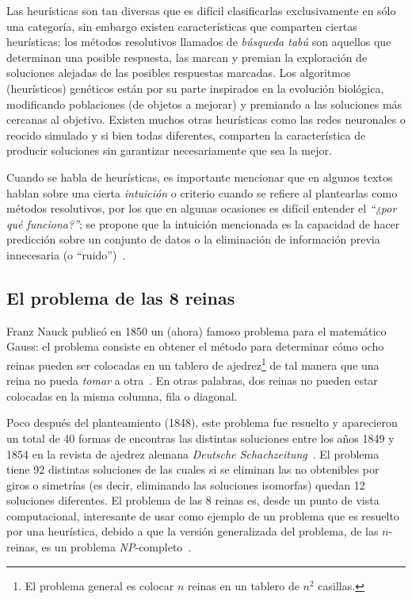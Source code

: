 Las heurísticas son tan diversas que es difícil clasificarlas exclusivamente en sólo 
una categoría, sin embargo existen características que comparten ciertas heurísticas:
los métodos resolutivos llamados de \textit{búsqueda tabú} son aquellos que determinan 
una posible respuesta, las marcan y premian la exploración de soluciones alejadas de las 
posibles respuestas marcadas. Los algoritmos (heurísticos) genéticos están por su parte 
inspirados en la evolución biológica, modificando poblaciones (de objetos a mejorar) y 
premiando a las soluciones más cercanas al objetivo. Existen muchos otras heurísticas como 
las redes neuronales o reocido simulado y si bien todas diferentes, comparten la 
característica de producir soluciones sin garantizar necesariamente que sea la mejor.

Cuando se habla de heurísticas, es importante mencionar que en algunos
textos~\cite{Pearl1984} hablan sobre una cierta \textit{intuición} o criterio
cuando se refiere al plantearlas como métodos resolutivos, por
los que en algunas ocasiones es difícil entender el \textit{``¿por qué
  funciona?''}; se propone que la intuición mencionada es la capacidad de hacer
predicción sobre un conjunto de datos o la eliminación de información previa
innecesaria (o ``ruido'')~\cite{Gigerenzer2008}.

\subsection{El problema de las 8 reinas}

Franz Nauck publicó en 1850 un (ahora) famoso problema para el matemático Gauss:
el problema consiste en obtener el método para determinar cómo ocho reinas
pueden ser colocadas en un tablero de ajedrez\footnote{El problema general es
  colocar $n$ reinas en un tablero de $n^{2}$ casillas.} de tal manera que una
reina no pueda \textit{tomar} a otra~\cite{RouseBall2008}. En otras palabras,
dos reinas no pueden estar colocadas en la misma columna, fila o diagonal.



Poco después del planteamiento (1848), este problema fue resuelto y aparecieron
un total de 40 formas de encontras las distintas soluciones entre los años 1849 y 
1854 en la revista de ajedrez alemana \textit{Deutsche Schachzeitung}~\cite{Campbell1977}. 
El problema tiene 92 distintas soluciones de las cuales si se eliminan las no 
obtenibles por giros o simetrías (es decir, eliminando las soluciones isomorfas)
quedan 12 soluciones diferentes. El problema de las 8 reinas es, desde un punto de 
vista computacional, interesante de usar como 
ejemplo de un problema que es resuelto por una heurística, debido a que la 
versión generalizada del problema, de las $n$-reinas, es un problema 
\textsl{NP}-completo~\cite{Gent2017}.


